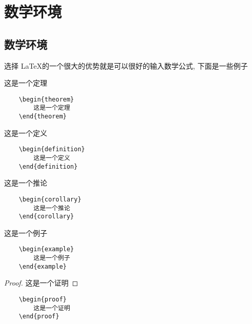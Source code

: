 \chapter{数学环境}
\section{数学环境}
选择 \LaTeX 的一个很大的优势就是可以很好的输入数学公式, 下面是一些例子
\begin{theorem}
    这是一个定理
\end{theorem}
\begin{lstlisting}
    \begin{theorem}
        这是一个定理
    \end{theorem}
\end{lstlisting}

\begin{definition}
    这是一个定义
\end{definition}
\begin{lstlisting}
    \begin{definition}
        这是一个定义
    \end{definition}
\end{lstlisting}

\begin{corollary}
    这是一个推论
\end{corollary}
\begin{lstlisting}
    \begin{corollary}
        这是一个推论
    \end{corollary}
\end{lstlisting}

\begin{example}
    这是一个例子
\end{example}
\begin{lstlisting}
    \begin{example}
        这是一个例子
    \end{example}
\end{lstlisting}

\begin{proof}
    这是一个证明
\end{proof}
\begin{lstlisting}
    \begin{proof}
        这是一个证明
    \end{proof}
\end{lstlisting}

